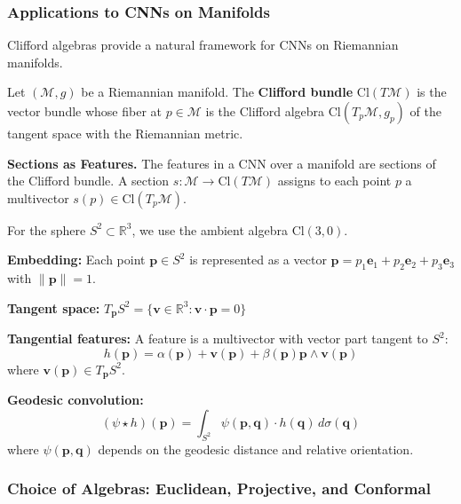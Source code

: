 \subsubsection{Applications to CNNs on Manifolds}

Clifford algebras provide a natural framework for CNNs on Riemannian manifolds.

\begin{definition}\label{def:clifford_bundle}
Let $(\mathcal{M}, g)$ be a Riemannian manifold. The \textbf{Clifford bundle} $\text{Cl}(T\mathcal{M})$ is the vector bundle whose fiber at $p \in \mathcal{M}$ is the Clifford algebra $\text{Cl}(T_p\mathcal{M}, g_p)$ of the tangent space with the Riemannian metric.
\end{definition}

\textbf{Sections as Features.}\label{rem:secciones_clifford} The features in a CNN over a manifold are sections of the Clifford bundle. A section $s: \mathcal{M} \to \text{Cl}(T\mathcal{M})$ assigns to each point $p$ a multivector $s(p) \in \text{Cl}(T_p\mathcal{M})$.

\begin{example}\label{ex:cnn_sphere_clifford}
For the sphere $S^2 \subset \mathbb{R}^3$, we use the ambient algebra $\text{Cl}(3,0)$.

\textbf{Embedding:}
Each point $\mathbf{p} \in S^2$ is represented as a vector $\mathbf{p} = p_1 \mathbf{e}_1 + p_2 \mathbf{e}_2 + p_3 \mathbf{e}_3$ with $\|\mathbf{p}\| = 1$.

\textbf{Tangent space:}
$T_\mathbf{p} S^2 = \{\mathbf{v} \in \mathbb{R}^3 : \mathbf{v} \cdot \mathbf{p} = 0\}$

\textbf{Tangential features:}
A feature is a multivector with vector part tangent to $S^2$:
\[h(\mathbf{p}) = \alpha(\mathbf{p}) + \mathbf{v}(\mathbf{p}) + \beta(\mathbf{p}) \mathbf{p} \wedge \mathbf{v}(\mathbf{p})\]
where $\mathbf{v}(\mathbf{p}) \in T_\mathbf{p} S^2$.

\textbf{Geodesic convolution:}
\[(\psi \star h)(\mathbf{p}) = \int_{S^2} \psi(\mathbf{p}, \mathbf{q}) \cdot h(\mathbf{q}) \, d\sigma(\mathbf{q})\]
where $\psi(\mathbf{p}, \mathbf{q})$ depends on the geodesic distance and relative orientation.
\end{example}

\subsubsection{Choice of Algebras: Euclidean, Projective, and Conformal}

